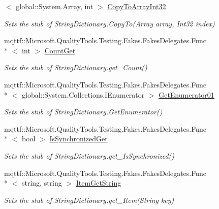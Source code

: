 \begin{DoxyCompactItemize}
$<$ global\-::\-System.\-Array, int $>$ \hyperlink{class_system_1_1_collections_1_1_specialized_1_1_fakes_1_1_stub_string_dictionary_aefa450934cebcd11bf272666f74d0e78}{Copy\-To\-Array\-Int32}
\begin{DoxyCompactList}\small\item\em Sets the stub of String\-Dictionary.\-Copy\-To(\-Array array, Int32 index)\end{DoxyCompactList}\item 
mqttf\-::\-Microsoft.\-Quality\-Tools.\-Testing.\-Fakes.\-Fakes\-Delegates.\-Func\\*
$<$ int $>$ \hyperlink{class_system_1_1_collections_1_1_specialized_1_1_fakes_1_1_stub_string_dictionary_a2de7d9c231ca4e728325b03475b4edb3}{Count\-Get}
\begin{DoxyCompactList}\small\item\em Sets the stub of String\-Dictionary.\-get\-\_\-\-Count()\end{DoxyCompactList}\item 
mqttf\-::\-Microsoft.\-Quality\-Tools.\-Testing.\-Fakes.\-Fakes\-Delegates.\-Func\\*
$<$ global\-::\-System.\-Collections.\-I\-Enumerator $>$ \hyperlink{class_system_1_1_collections_1_1_specialized_1_1_fakes_1_1_stub_string_dictionary_a77acdaec1c7042e516116d6ab99486e6}{Get\-Enumerator01}
\begin{DoxyCompactList}\small\item\em Sets the stub of String\-Dictionary.\-Get\-Enumerator()\end{DoxyCompactList}\item 
mqttf\-::\-Microsoft.\-Quality\-Tools.\-Testing.\-Fakes.\-Fakes\-Delegates.\-Func\\*
$<$ bool $>$ \hyperlink{class_system_1_1_collections_1_1_specialized_1_1_fakes_1_1_stub_string_dictionary_a6d6a19d02b1ab89583fe4632da73f912}{Is\-Synchronized\-Get}
\begin{DoxyCompactList}\small\item\em Sets the stub of String\-Dictionary.\-get\-\_\-\-Is\-Synchronized()\end{DoxyCompactList}\item 
mqttf\-::\-Microsoft.\-Quality\-Tools.\-Testing.\-Fakes.\-Fakes\-Delegates.\-Func\\*
$<$ string, string $>$ \hyperlink{class_system_1_1_collections_1_1_specialized_1_1_fakes_1_1_stub_string_dictionary_ae7e1c157cd848564586c2df7fe1cad90}{Item\-Get\-String}
\begin{DoxyCompactList}\small\item\em Sets the stub of String\-Dictionary.\-get\-\_\-\-Item(\-String key)\end{DoxyCompactList}\item 

\end{DoxyCompactItemize}
